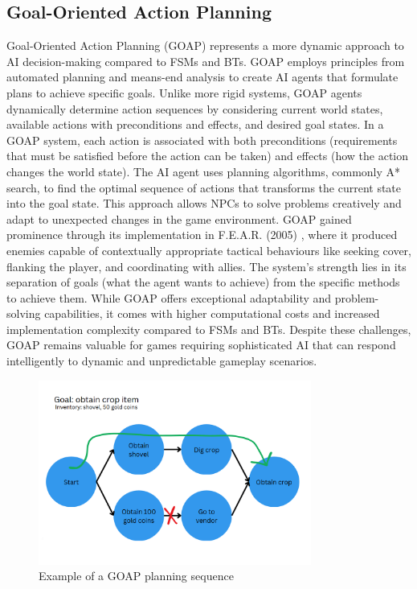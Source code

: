 \subsection{Goal-Oriented Action Planning}

Goal-Oriented Action Planning (GOAP) represents a more dynamic approach to AI decision-making compared to FSMs and BTs. 
GOAP employs principles from automated planning and means-end analysis to create AI agents that formulate plans to achieve specific goals. Unlike more rigid systems, GOAP agents dynamically determine action sequences by considering current world states, available actions with preconditions and effects, and desired goal states.
In a GOAP system, each action is associated with both preconditions (requirements that must be satisfied before the action can be taken) and effects (how the action changes the world state).
The AI agent uses planning algorithms, commonly A* search, to find the optimal sequence of actions that transforms the current state into the goal state. 
This approach allows NPCs to solve problems creatively and adapt to unexpected changes in the game environment.
GOAP gained prominence through its implementation in F.E.A.R. (2005) \cite{thompson2020fear}, where it produced enemies capable of contextually appropriate tactical behaviours like seeking cover, flanking the player, and coordinating with allies. 
The system's strength lies in its separation of goals (what the agent wants to achieve) from the specific methods to achieve them.
While GOAP offers exceptional adaptability and problem-solving capabilities, it comes with higher computational costs and increased implementation complexity compared to FSMs and BTs. Despite these challenges, GOAP remains valuable for games requiring sophisticated AI that can respond intelligently to dynamic and unpredictable gameplay scenarios.

\begin{figure}[H]
    \centering
    \includegraphics[width=0.8\textwidth]{figures/goap.png}
    \caption{Example of a GOAP planning sequence}
    \label{fig:goap}
\end{figure}

